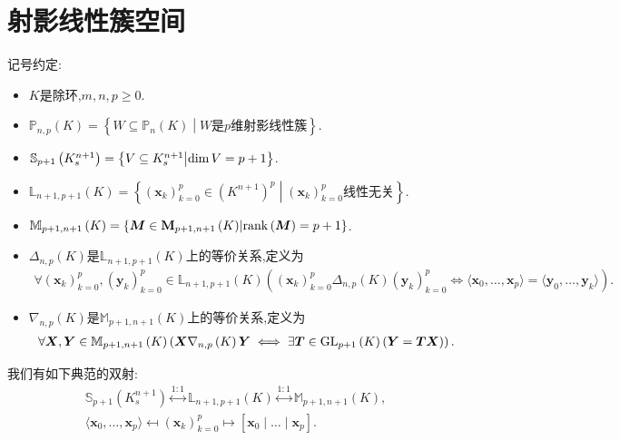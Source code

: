 \section{射影线性簇空间}

记号约定:
\begin{itemize}
	\item $K$是除环,$m,n,p\geq 0$.
	\item $\mathbb{P}_{n,p}\left(K\right)=\left\{W\subseteq\mathbb{P}_{n}\left(K\right)\middle|W\text{是}p\text{维射影线性簇}\right\}$.
	\item $\S_{p+1}\left(K_{s}^{n+1}\right)=\left\{V\subseteq K_{s}^{n+1}\middle|\dim V=p+1\right\}$.
	\item $\mathbb{L}_{n+1,p+1}\left(K\right)=\left\{\left(\mathbf{x}_{k}\right)_{k=0}^{p}\in \left(K^{n+1}\right)^{p}\middle|\left(\mathbf{x}_{k}\right)_{k=0}^{p}\text{线性无关}\right\}$.
	\item $\mathbb{M}_{p+1,n+1}\left(K\right)=\left\{\bm{M}\in\Mat_{p+1,n+1}\left(K\right)\middle|\rank\left(\bm{M}\right)=p+1\right\}$.
	\item $\Delta_{n,p}\left(K\right)$是$\mathbb{L}_{n+1,p+1}\left(K\right)$上的等价关系,定义为
	\begin{align*}
		\forall\left(\mathbf{x}_{k}\right)_{k=0}^{p},\left(\mathbf{y}_{k}\right)_{k=0}^{p}\in\mathbb{L}_{n+1,p+1}\left(K\right)\left(\left(\mathbf{x}_{k}\right)_{k=0}^{p}\Delta_{n,p}\left(K\right)\left(\mathbf{y}_{k}\right)_{k=0}^{p}\iff\langle\mathbf{x}_{0},\ldots,\mathbf{x}_{p}\rangle=\langle\mathbf{y}_{0},\ldots,\mathbf{y}_{k}\rangle\right).
	\end{align*}
	\item $\nabla_{n,p}\left(K\right)$是$\mathbb{M}_{p+1,n+1}\left(K\right)$上的等价关系,定义为
	\begin{align*}
		\forall\bm{X},\bm{Y}\in\mathbb{M}_{p+1,n+1}\left(K\right)\left(\bm{X}\nabla_{n,p}\left(K\right)\bm{Y}\iff\exists\bm{T}\in\GL_{p+1}\left(K\right)\left(\bm{Y}=\bm{T}\bm{X}\right)\right).
	\end{align*}
\end{itemize}

\begin{proposition}{}{}
	我们有如下典范的双射:
	\begin{gather*}
		\mathbb{S}_{p+1}\left(K_{s}^{n+1}\right)\overset{1:1}{\longleftrightarrow}\mathbb{L}_{n+1,p+1}\left(K\right)\overset{1:1}{\longleftrightarrow}\mathbb{M}_{p+1,n+1}\left(K\right),\\
		\langle\mathbf{x}_{0},\ldots,\mathbf{x}_{p}\rangle\mapsfrom\left(\mathbf{x}_{k}\right)_{k=0}^{p}\mapsto\left[\mathbf{x}_{0}\mid\ldots\mid\mathbf{x}_{p}\right].
	\end{gather*}
\end{proposition}

